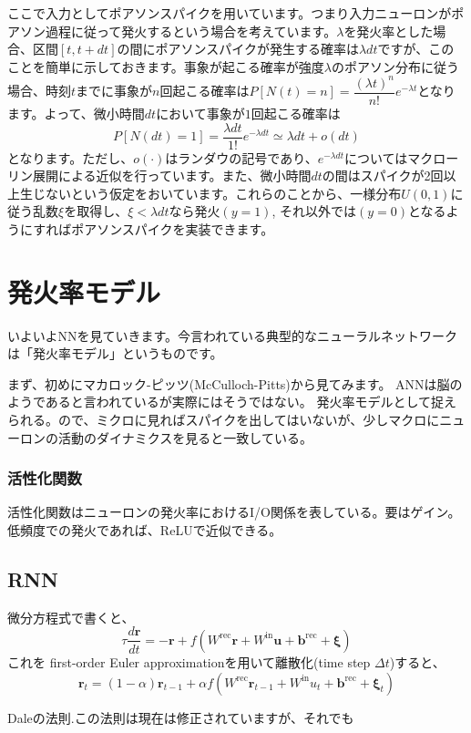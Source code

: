 \documentclass[11pt,dvipdfmx,b5paper,oneside]{jsbook}
\begin{document}
ここで入力としてポアソンスパイクを用いています。つまり入力ニューロンがポアソン過程に従って発火するという場合を考えています。$\lambda$を発火率とした場合、区間$[t, t+dt]$の間にポアソンスパイクが発生する確率は$\lambda dt$ですが、このことを簡単に示しておきます。事象が起こる確率が強度$\lambda$のポアソン分布に従う場合、時刻$t$までに事象が$n$回起こる確率は$P[N(t)=n]=\dfrac{(\lambda t)^{n}}{n !} e^{-\lambda t}$となります。よって、微小時間$dt$において事象が$1$回起こる確率は
$$P[N(d t)=1]=\dfrac{\lambda dt}{1 !} e^{-\lambda dt}\simeq \lambda dt+o(dt)$$
となります。ただし、$o(\cdot)$はランダウの記号であり、$e^{-\lambda dt}$についてはマクローリン展開による近似を行っています。また、微小時間$dt$の間はスパイクが2回以上生じないという仮定をおいています。これらのことから、一様分布$U(0,1)$に従う乱数$\xi$を取得し、$\xi<\lambda dt$なら発火$(y=1)$, それ以外では$(y=0)$となるようにすればポアソンスパイクを実装できます。

\section{発火率モデル}
いよいよNNを見ていきます。今言われている典型的なニューラルネットワークは「発火率モデル」というものです。\par
まず、初めにマカロック-ピッツ(McCulloch-Pitts)から見てみます。
ANNは脳のようであると言われているが実際にはそうではない。
発火率モデルとして捉えられる。ので、ミクロに見ればスパイクを出してはいないが、少しマクロにニューロンの活動のダイナミクスを見ると一致している。
\subsubsection{活性化関数}
活性化関数はニューロンの発火率におけるI/O関係を表している。要はゲイン。低頻度での発火であれば、ReLUで近似できる。
\subsection{RNN}
微分方程式で書くと、
$$
\tau \frac{d \boldsymbol{r}}{dt}=-\boldsymbol{r}+f(W^{\text{rec}}\boldsymbol{r}+W^{\text{in}}\boldsymbol{u}+\boldsymbol{b}^{\text{rec}}+\boldsymbol{\xi})
$$
これを first-order Euler approximationを用いて離散化(time step $\Delta t$)すると、
$$
\boldsymbol{r}_t=(1-\alpha) \boldsymbol{r}_{t-1}+\alpha f(W^{\text{rec}}\boldsymbol{r}_{t-1}+W^{\text{in}}u_{t}+\boldsymbol{b}^{\text{rec}}+\boldsymbol{\xi}_t)
$$

\begin{tcolorbox}[title=Daleの原理を守ったRNN]
Daleの法則.この法則は現在は修正されていますが、それでも
\end{tcolorbox}
\end{document}
